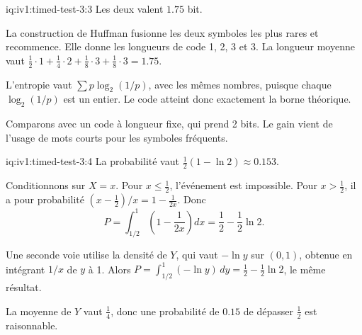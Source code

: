 \enlargethispage{-3\baselineskip}%
\begin{solution}{iq:iv1:timed-test-3:3}
Les deux valent $1.75$ bit.

La construction de Huffman fusionne les deux symboles les plus rares et recommence. Elle donne les longueurs de code 1, 2, 3 et 3. La longueur moyenne vaut $\frac12 \cdot 1 + \frac14 \cdot 2 + \frac18 \cdot 3 + \frac18 \cdot 3 = 1.75$.

L'entropie vaut $\sum p\log_2(1/p)$, avec les mêmes nombres, puisque chaque $\log_2(1/p)$ est un entier. Le code atteint donc exactement la borne théorique.

Comparons avec un code à longueur fixe, qui prend 2 bits. Le gain vient de l'usage de mots courts pour les symboles fréquents.

\end{solution}

\begin{solution}{iq:iv1:timed-test-3:4}
La probabilité vaut $\frac12(1 - \ln 2) \approx 0.153$.

Conditionnons sur $X = x$. Pour $x \le \frac12$, l'événement est impossible. Pour $x > \frac12$, il a pour probabilité $(x - \frac12)/x = 1 - \frac{1}{2x}$. Donc
\[
P = \int_{1/2}^1\left(1 - \frac{1}{2x}\right)dx = \frac12 - \frac12\ln 2.
\]

Une seconde voie utilise la densité de $Y$, qui vaut $-\ln y$ sur $(0, 1)$, obtenue en intégrant $1/x$ de $y$ à 1. Alors $P = \int_{1/2}^1(-\ln y)\,dy = \frac12 - \frac12\ln 2$, le même résultat.

La moyenne de $Y$ vaut $\frac14$, donc une probabilité de $0.15$ de dépasser $\frac12$ est raisonnable.

\end{solution}

